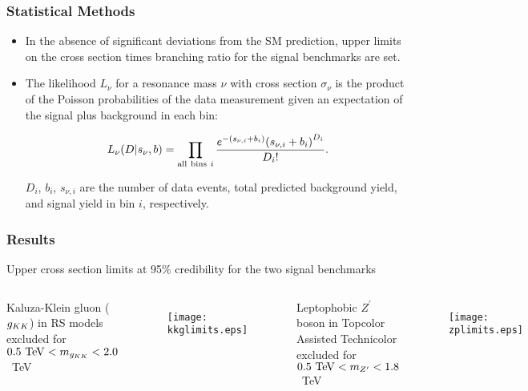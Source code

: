 \begin{frame}
    \frametitle{Statistical Methods}
\begin{itemize}
    \item In the absence of significant deviations from the SM
        prediction, upper limits on the cross section times branching
        ratio for the signal benchmarks are set.
    \item The likelihood $L_\nu$ for a resonance mass $\nu$ with cross
        section $\sigma_\nu$ is the product of the Poisson
        probabilities of the data measurement given an expectation of
        the signal plus background in each bin:

\begin{equation*}
    L_\nu(D | s_\nu, b) = \prod_{{\rm all\ bins}\ i}
    \frac{e^{-(s_{\nu,i} + b_i)} {(s_{\nu,i} + b_i)}^{D_i}}
    {D_i!}.
\end{equation*}

\noindent $D_i$, $b_i$, $s_{\nu,i}$ are the number of data events,
total predicted background yield, and signal yield in bin $i$,
respectively.

\end{itemize}
\end{frame}

\begin{frame}[b]
    \frametitle{Results}
    \centering
Upper cross section limits at 95\% credibility for the two signal
benchmarks
\vspace{0.5cm}
\begin{columns}
    \centering
    Kaluza-Klein gluon ($g_{KK}$) in RS models excluded for
    $0.5~{\rm TeV} < m_{g_{KK}} < 2.0$~TeV
\begin{figure}
\texttt{[image: kkglimits.eps]}
\end{figure}
    \centering
    Leptophobic $Z^\prime$ boson in Topcolor Assisted Technicolor
    excluded for $0.5~{\rm TeV} < m_{Z^\prime} < 1.8$~TeV
\begin{figure}
\texttt{[image: zplimits.eps]}
\end{figure}
\end{columns}
\end{frame}
